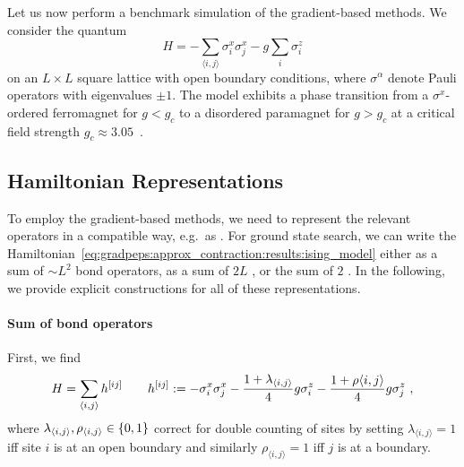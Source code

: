 Let us now perform a benchmark simulation of the gradient-based methods.
%
We consider the quantum 
\begin{equation}
    \label{eq:gradpeps:approx_contraction:results:ising_model}
    H = -\sum_{\langle i, j\rangle} \sigma^x_i \sigma^x_j - g \sum_i \sigma_i^z
\end{equation}
on an $L \times L$ square lattice with open boundary conditions, where $\sigma^\alpha$ denote Pauli operators with eigenvalues $\pm 1$.
%
The model exhibits a phase transition from a $\sigma^x$-ordered ferromagnet for $g < g_c$ to a disordered paramagnet for $g > g_c$ at a critical field strength $g_c \approx 3.05$~\cite{blote2002}.


\subsection{Hamiltonian Representations}
\label{subsec:gradpeps:benchmark:hamiltonian_pepos}
To employ the gradient-based methods, we need to represent the relevant operators in a compatible way, e.g.~as .
%
For ground state search, we can write the Hamiltonian~\eqref{eq:gradpeps:approx_contraction:results:ising_model} either as a sum of $\sim L^2$ bond operators, as a sum of $2L$ , or the sum of $2$ .
%
In the following, we provide explicit constructions for all of these representations.

\paragraph{Sum of bond operators}
First, we find
\begin{equation}
    \label{eq:gradpeps:benchmark:tfim_hamiltonian_as_bond_ops}
    H = \sum_{\langle i, j \rangle} h^{[ij]}
    \qquad
    h^{[ij]} := - \sigma_i^x \sigma_j^x - \frac{1 + \lambda_{\langle i, j \rangle}}{4}g \sigma_i^z - \frac{1 + \rho{\langle i, j \rangle}}{4}g \sigma_j^z
    ~,
\end{equation}
where $\lambda_{\langle i, j \rangle}, \rho_{\langle i, j \rangle} \in \set{0, 1}$ correct for double counting of sites by setting $\lambda_{\langle i, j \rangle} = 1$ iff site $i$ is at an open boundary and similarly $\rho_{\langle i, j \rangle} = 1$ iff $j$ is at a boundary.


